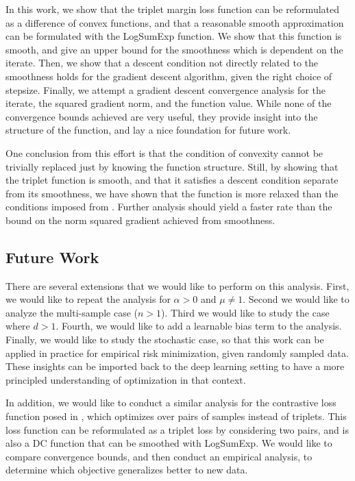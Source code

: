 \documentclass[11pt]{article}
\begin{document}
In this work, we show that the triplet margin loss function can be reformulated as a difference of convex functions, and that a reasonable smooth approximation can be formulated with the LogSumExp function. We show that this function is smooth, and give an upper bound for the smoothness which is dependent on the iterate. Then, we show that a descent condition not directly related to the smoothness holds for the gradient descent algorithm, given the right choice of stepsize. Finally, we attempt a gradient descent convergence analysis for the iterate, the squared gradient norm, and the function value. While none of the convergence bounds achieved are very useful, they provide insight into the structure of the function, and lay a nice foundation for future work.

One conclusion from this effort is that the condition of convexity cannot be trivially replaced just by knowing the function structure. Still, by showing that the triplet function is smooth, and that it satisfies a descent condition separate from its smoothness, we have shown that the function is more relaxed than the conditions imposed from \cite{khamaru_convergence_2018}. Further analysis should yield a faster rate than the bound on the norm squared gradient achieved from smoothness.

\subsection{Future Work}

There are several extensions that we would like to perform on this analysis. First, we would like to repeat the analysis for $\alpha > 0$ and $\mu \neq 1$. Second we would like to analyze the multi-sample case ($n > 1$). Third we would like to study the case where $d > 1$. Fourth, we would like to add a learnable bias term to the analysis. Finally, we would like to study the stochastic case, so that this work can be applied in practice for empirical risk minimization, given randomly sampled data. These insights can be imported back to the deep learning setting to have a more principled understanding of optimization in that context.

In addition, we would like to conduct a similar analysis for the contrastive loss function posed in \cite{hadsell_dimensionality_2006}, which optimizes over pairs of samples instead of triplets. This loss function can be reformulated as a triplet loss by considering two pairs, and is also a DC function that can be smoothed with LogSumExp. We would like to compare convergence bounds, and then conduct an empirical analysis, to determine which objective generalizes better to new data.
\end{document}
